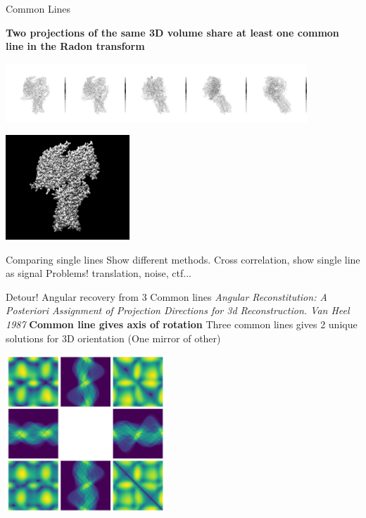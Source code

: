 \documentclass[t, 11pt]{beamer}
\begin{document}
\begin{frame}[fragile]{Common Lines}

  \textbf{Two projections of the same 3D volume share at least one common line in the Radon transform}
 \begin{center}\includegraphics[width=0.85\textwidth]{images/common_line.png}
    \end{center}
 \begin{center}\includegraphics[width=0.35\textwidth]{images/3D_model.png}
    \end{center}

\end{frame}

\begin{frame}[fragile]{Comparing single lines}
  Show different methods.
  Cross correlation,
  show single line as signal
  Problems! translation, noise, ctf...
\end{frame}

\begin{frame}[fragile]{Detour! Angular recovery from 3 Common lines}
  \textit{\tiny{Angular Reconstitution: A Posteriori Assignment of Projection Directions for 3d Reconstruction. Van Heel 1987}}
  \textbf{Common line gives axis of rotation}
  Three common lines gives 2 unique solutions for 3D orientation (One mirror of other)
  \begin{center}\includegraphics[width=0.45\textwidth]{images/Sinogram_3_comp.png}
    \end{center}
\end{frame}
\end{document}
